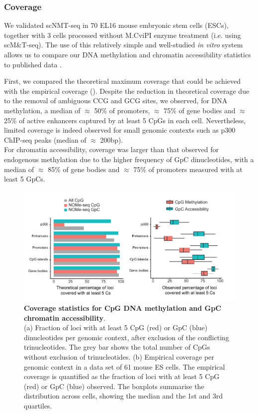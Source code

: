 \subsubsection{Coverage} \label{section:scnmt_coverage}

We validated scNMT-seq in 70 EL16 mouse embryonic stem cells (ESCs), together with 3 cells processed without M.CviPI enzyme treatment (i.e. using scM\&T-seq). The use of this relatively simple and well-studied \textit{in vitro} system allows us to compare our DNA methylation and chromatin accessibility statistics to published data \cite{Smallwood2014,Angermueller2016,Ficz2013}.

First, we compared the theoretical maximum coverage that could be achieved with the empirical coverage (). Despite the reduction in theoretical coverage due to the removal of ambiguous CCG and GCG sites, we observed, for DNA methylation, a median of $\approx$ 50\% of promoters, $\approx$ 75\% of gene bodies and $\approx$ 25\% of active enhancers captured by at least 5 CpGs in each cell. Nevertheless, limited coverage is indeed observed for small genomic contexts such as p300 ChIP-seq peaks (median of $\approx$ 200bp).\\
For chromatin accessibility, coverage was larger than that observed for endogenous methylation due to the higher frequency of GpC dinucleotides, with a median of $\approx$ 85\% of gene bodies and $\approx$ 75\% of promoters measured with at least 5 GpCs.

\begin{figure}[H]
	\centering
	\includegraphics[width=1.0\linewidth]{scNMT_coverage}
	\caption[]{\textbf{Coverage statistics for CpG DNA methylation and GpC chromatin accessibility}.\\ 
	(a) Fraction of loci with at least 5 CpG (red) or GpC (blue) dinucleotides per genomic context, after exclusion of the conflicting trinucleotides. The grey bar shows the total number of CpGs without exclusion of trinucleotides. (b) Empirical coverage per genomic context in a data set of 61 mouse ES cells. The empirical coverage is quantified as the fraction of loci with at least 5 CpG (red) or GpC (blue) observed. The boxplots summarise the distribution across cells, showing the median and the 1st and 3rd quartiles.}
	\label{fig:scnmt_coverage}
\end{figure}

